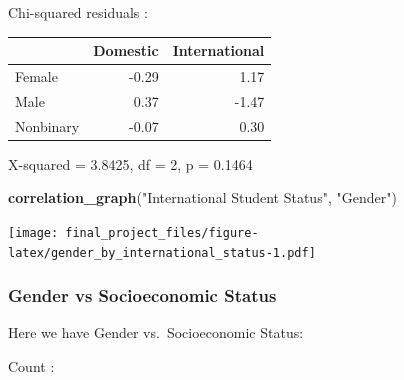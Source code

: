 \documentclass[
  twocolumn]{article}
\newenvironment{Shaded}{\begin{snugshade}}{\end{snugshade}}
\newcommand{\FunctionTok}[1]{\textcolor[rgb]{0.13,0.29,0.53}{\textbf{#1}}}
\newcommand{\NormalTok}[1]{#1}
\newcommand{\SpecialCharTok}[1]{\textcolor[rgb]{0.81,0.36,0.00}{\textbf{#1}}}
\newcommand{\StringTok}[1]{\textcolor[rgb]{0.31,0.60,0.02}{#1}}
\begin{document}
Chi-squared residuals :

\begin{longtable}[]{@{}lrr@{}}
\toprule\noalign{}
& Domestic & International \\
\midrule\noalign{}
\endhead
\bottomrule\noalign{}
\endlastfoot
Female & -0.29 & 1.17 \\
Male & 0.37 & -1.47 \\
Nonbinary & -0.07 & 0.30 \\
\end{longtable}

X-squared = 3.8425, df = 2, p = 0.1464

\begin{Shaded}
\begin{Highlighting}[]
\FunctionTok{correlation\_graph}\NormalTok{(}\StringTok{"International Student Status"}\NormalTok{, }\StringTok{"Gender"}\NormalTok{)}
\end{Highlighting}
\end{Shaded}

\texttt{[image: final\_project\_files/figure-latex/gender\_by\_international\_status-1.pdf]}

\subsubsection{Gender vs Socioeconomic
Status}\label{gender-vs-socioeconomic-status}

Here we have Gender vs.~Socioeconomic Status:

\begin{Shaded}
\end{Shaded}

Count :
\end{document}
